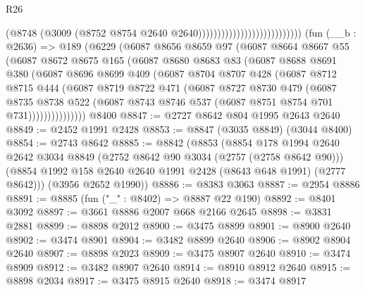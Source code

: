 \begin{lexlean}{R26}
\begin{coremodule}
                                                    (@8748
                                                      (@3009
                                                        (@8752
                                                          @8754
                                                          @2640
                                                          @2640)))))))))))))))))))))))))))
    (fun (__b : @2636) =>
    @189
      (@6229
        (@6087
          @8656
          @8659
          @97
          (@6087
            @8664
            @8667
            @55
            (@6087
              @8672
              @8675
              @165
              (@6087
                @8680
                @8683
                @83
                (@6087
                  @8688
                  @8691
                  @380
                  (@6087
                    @8696
                    @8699
                    @409
                    (@6087
                      @8704
                      @8707
                      @428
                      (@6087
                        @8712
                        @8715
                        @444
                        (@6087
                          @8719
                          @8722
                          @471
                          (@6087
                            @8727
                            @8730
                            @479
                            (@6087
                              @8735
                              @8738
                              @522
                              (@6087 @8743 @8746 @537 (@6087 @8751 @8754 @701 @731)))))))))))))))
    @8400
@8847 := @2727 @8642 @804 @1995 @2643 @2640
@8849 := @2452 @1991 @2428
@8853 := @8847 (@3035 @8849) (@3044 @8400)
@8854 := @2743 @8642
@8885 := @8842
    (@8853
      (@8854
        @178
        @1994
        @2640
        @2642
        @3034
        @8849
        (@2752 @8642 @90 @3034 (@2757 (@2758 @8642 @90)))
        (@8854 @1992 @158 @2640 @2640 @1991 @2428 (@8643 @648 @1991) (@2777 @8642)))
      (@3956 @2652 @1990))
@8886 := @8383 @3063
@8887 := @2954 @8886
@8891 := @8885 (fun ("_" : @8402) => @8887 @22 @190)
@8892 := @8401 @3092
@8897 := @3661 @8886 @2007 @668 @2166 @2645
@8898 := @3831 @2881
@8899 := @8898 @2012
@8900 := @3475 @8899
@8901 := @8900 @2640
@8902 := @3474 @8901
@8904 := @3482 @8899 @2640
@8906 := @8902 @8904 @2640
@8907 := @8898 @2023
@8909 := @3475 @8907 @2640
@8910 := @3474 @8909
@8912 := @3482 @8907 @2640
@8914 := @8910 @8912 @2640
@8915 := @8898 @2034
@8917 := @3475 @8915 @2640
@8918 := @3474 @8917

\end{coremodule}
\end{lexlean}
